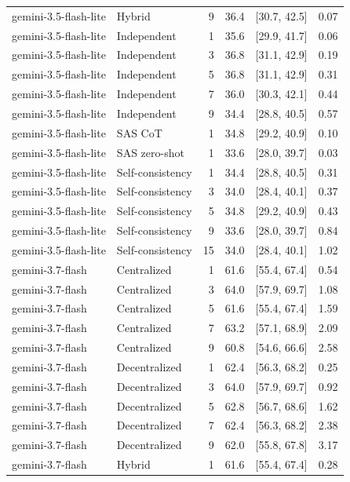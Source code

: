 \begin{tabular}{@{}llrrrr@{}}
gemini-3.5-flash-lite & Hybrid & 9 & 36.4 & [30.7, 42.5] & 0.07 \\
gemini-3.5-flash-lite & Independent & 1 & 35.6 & [29.9, 41.7] & 0.06 \\
gemini-3.5-flash-lite & Independent & 3 & 36.8 & [31.1, 42.9] & 0.19 \\
gemini-3.5-flash-lite & Independent & 5 & 36.8 & [31.1, 42.9] & 0.31 \\
gemini-3.5-flash-lite & Independent & 7 & 36.0 & [30.3, 42.1] & 0.44 \\
gemini-3.5-flash-lite & Independent & 9 & 34.4 & [28.8, 40.5] & 0.57 \\
gemini-3.5-flash-lite & SAS CoT & 1 & 34.8 & [29.2, 40.9] & 0.10 \\
gemini-3.5-flash-lite & SAS zero-shot & 1 & 33.6 & [28.0, 39.7] & 0.03 \\
gemini-3.5-flash-lite & Self-consistency & 1 & 34.4 & [28.8, 40.5] & 0.31 \\
gemini-3.5-flash-lite & Self-consistency & 3 & 34.0 & [28.4, 40.1] & 0.37 \\
gemini-3.5-flash-lite & Self-consistency & 5 & 34.8 & [29.2, 40.9] & 0.43 \\
gemini-3.5-flash-lite & Self-consistency & 9 & 33.6 & [28.0, 39.7] & 0.84 \\
gemini-3.5-flash-lite & Self-consistency & 15 & 34.0 & [28.4, 40.1] & 1.02 \\
gemini-3.7-flash & Centralized & 1 & 61.6 & [55.4, 67.4] & 0.54 \\
gemini-3.7-flash & Centralized & 3 & 64.0 & [57.9, 69.7] & 1.08 \\
gemini-3.7-flash & Centralized & 5 & 61.6 & [55.4, 67.4] & 1.59 \\
gemini-3.7-flash & Centralized & 7 & 63.2 & [57.1, 68.9] & 2.09 \\
gemini-3.7-flash & Centralized & 9 & 60.8 & [54.6, 66.6] & 2.58 \\
gemini-3.7-flash & Decentralized & 1 & 62.4 & [56.3, 68.2] & 0.25 \\
gemini-3.7-flash & Decentralized & 3 & 64.0 & [57.9, 69.7] & 0.92 \\
gemini-3.7-flash & Decentralized & 5 & 62.8 & [56.7, 68.6] & 1.62 \\
gemini-3.7-flash & Decentralized & 7 & 62.4 & [56.3, 68.2] & 2.38 \\
gemini-3.7-flash & Decentralized & 9 & 62.0 & [55.8, 67.8] & 3.17 \\
gemini-3.7-flash & Hybrid & 1 & 61.6 & [55.4, 67.4] & 0.28 \\

\end{tabular}
